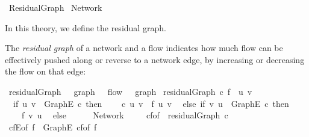 %
\begin{isabellebody}%
%
%
\isamarkuptrue%
%
\isadelimtheory
%
\endisadelimtheory
%
\isatagtheory
{}\isamarkupfalse%
\ Residual{\isacharunderscore}Graph\isanewline
{}\ Network\isanewline
{}%
\endisatagtheory
{\isafoldtheory}%
%
\isadelimtheory
%
\endisadelimtheory
%
\begin{isamarkuptext}%
In this theory, we define the residual graph.%
\end{isamarkuptext}\isamarkuptrue%
%
\isamarkuptrue%
%
\begin{isamarkuptext}%
The \emph{residual graph} of a network and a flow indicates how much 
  flow can be effectively pushed along or reverse to a network edge,
  by increasing or decreasing the flow on that edge:%
\end{isamarkuptext}\isamarkuptrue%
\isamarkupfalse%
\ residualGraph\ {\isacharcolon}{\isacharcolon}\ {\isachardoublequoteopen}{\isacharunderscore}\ graph\ {\isasymRightarrow}\ {\isacharunderscore}\ flow\ {\isasymRightarrow}\ {\isacharunderscore}\ graph{\isachardoublequoteclose}\isanewline
{}\ {\isachardoublequoteopen}residualGraph\ c\ f\ {\isasymequiv}\ {\isasymlambda}{\isacharparenleft}u{\isacharcomma}\ v{\isacharparenright}{\isachardot}\isanewline
\ \ if\ {\isacharparenleft}u{\isacharcomma}\ v{\isacharparenright}\ {\isasymin}\ Graph{\isachardot}E\ c\ then\isanewline
\ \ \ \ c\ {\isacharparenleft}u{\isacharcomma}\ v{\isacharparenright}\ {\isacharminus}\ f\ {\isacharparenleft}u{\isacharcomma}\ v{\isacharparenright}\isanewline
\ \ else\ if\ {\isacharparenleft}v{\isacharcomma}\ u{\isacharparenright}\ {\isasymin}\ Graph{\isachardot}E\ c\ then\isanewline
\ \ \ \ f\ {\isacharparenleft}v{\isacharcomma}\ u{\isacharparenright}\isanewline
\ \ else\isanewline
\ \ \ \ {}{\isachardoublequoteclose}\isanewline
\isanewline
{}\isamarkupfalse%
\ Network\ \isanewline
\ \ \isanewline
{}\isamarkupfalse%
\ {\isachardoublequoteopen}cf{\isacharunderscore}of\ {\isasymequiv}\ residualGraph\ c{\isachardoublequoteclose}\isanewline
{}\isamarkupfalse%
\ {\isachardoublequoteopen}cfE{\isacharunderscore}of\ f\ {\isasymequiv}\ Graph{\isachardot}E\ {\isacharparenleft}cf{\isacharunderscore}of\ f{\isacharparenright}{\isachardoublequoteclose}%
\begin{isamarkuptext}%

\end{isamarkuptext}
\end{isabellebody}
